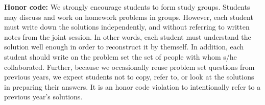{\bf Honor code:} We strongly encourage students to form study
groups. Students may discuss and work on homework problems in
groups. However, each student must write down the solutions independently,
and without referring to written notes from the joint session. In other
words, each student must understand the solution well enough in order to
reconstruct it by themself. In addition, each student should write on
the problem set the set of people with whom s/he collaborated.
Further, because we occasionally reuse problem set questions from previous
years, we expect students not to copy, refer to, or look at the solutions
in preparing their answers. It is an honor code violation to intentionally
refer to a previous year's solutions.
